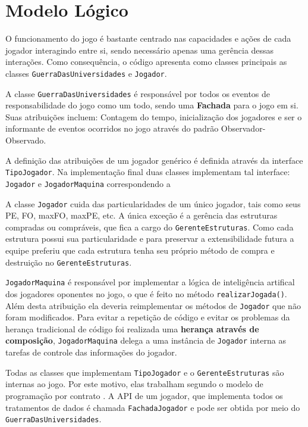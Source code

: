 \documentclass[brazil,times]{abnt}
\begin{document}
\section{Modelo Lógico}
O funcionamento do jogo é bastante centrado nas capacidades e ações de cada
jogador interagindo entre si, sendo necessário apenas uma gerência dessas
interações. Como consequência, o código apresenta como classes principais as
classes \texttt{GuerraDasUniversidades} e \texttt{Jogador}.

A classe \texttt{GuerraDasUniversidades} é responsável por todos os eventos de
responsabilidade do jogo como um todo, sendo uma \textbf{Fachada}
\cite{gof-design-patterns} para o jogo em si. Suas atribuições incluem: Contagem
do tempo, inicialização dos jogadores e ser o informante de eventos ocorridos no
jogo através do padrão Observador-Observado.

A definição das atribuições de um jogador genérico é definida através da
interface \texttt{TipoJogador}. Na implementação final duas classes implementam
tal interface: \texttt{Jogador} e \texttt{JogadorMaquina} correspondendo a 

A classe \texttt{Jogador} cuida das particularidades de um único jogador, tais
como seus PE, FO, maxFO, maxPE, etc. A única exceção é a gerência das estruturas
compradas ou compráveis, que fica a cargo do \texttt{GerenteEstruturas}. Como
cada estrutura possui sua particularidade e para preservar a extensibilidade
futura a equipe preferiu que cada estrutura tenha seu próprio método de
compra e destruição no \texttt{GerenteEstruturas}.

\texttt{JogadorMaquina} é responsável por implementar a lógica de inteligência
artifical dos jogadores oponentes no jogo, o que é feito no método
\texttt{realizarJogada()}. Além desta atribuição ela deveria reimplementar os
métodos de \texttt{Jogador} que não foram modificados. Para evitar a repetição
de código e evitar os problemas da herança tradicional de código foi realizada
uma \textbf{herança através de composição}, \texttt{JogadorMaquina} delega a uma
instância de \texttt{Jogador} interna as tarefas de controle das informações do
jogador.

Todas as classes que implementam \texttt{TipoJogador} e o 
\texttt{GerenteEstruturas} são internas ao jogo. Por este motivo, elas trabalham
segundo o modelo de programação por contrato \cite{meyer-design-by-contract}.
A API de um jogador, que implementa todos os tratamentos de dados é chamada
\texttt{FachadaJogador} e pode ser obtida por meio do
\texttt{GuerraDasUniversidades}.
\end{document}
